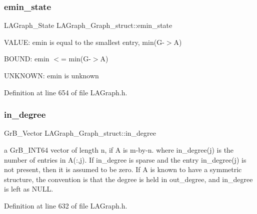 \mbox{\label{structLAGraph__Graph__struct_ad86508a1f8b0c38fd7420d28b2cff430}} 
\subsubsection{\texorpdfstring{emin\+\_\+state}{emin\_state}}
{\footnotesize\ttfamily L\+A\+Graph\+\_\+\+State L\+A\+Graph\+\_\+\+Graph\+\_\+struct\+::emin\+\_\+state}


\begin{DoxyItemize}
\item V\+A\+L\+UE\+: emin is equal to the smallest entry, min(G-\/$>$A)
\item B\+O\+U\+ND\+: emin $<$= min(G-\/$>$A)
\item U\+N\+K\+N\+O\+WN\+: emin is unknown 
\end{DoxyItemize}

Definition at line 654 of file L\+A\+Graph.\+h.

\mbox{\label{structLAGraph__Graph__struct_aa076ad742dc43f1caf1197c285abde44}} 
\subsubsection{\texorpdfstring{in\+\_\+degree}{in\_degree}}
{\footnotesize\ttfamily Gr\+B\+\_\+\+Vector L\+A\+Graph\+\_\+\+Graph\+\_\+struct\+::in\+\_\+degree}

a Gr\+B\+\_\+\+I\+N\+T64 vector of length n, if A is m-\/by-\/n. where in\+\_\+degree(j) is the number of entries in A(\+:,j). If in\+\_\+degree is sparse and the entry in\+\_\+degree(j) is not present, then it is assumed to be zero. If A is known to have a symmetric structure, the convention is that the degree is held in out\+\_\+degree, and in\+\_\+degree is left as N\+U\+LL. 

Definition at line 632 of file L\+A\+Graph.\+h.

\mbox{\label{structLAGraph__Graph__struct_aefb37c8aac85f1688aa5e460a574ef36}} 
